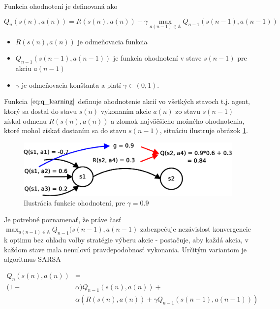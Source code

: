 Funkcia ohodnotení je definovaná ako

\begin{equation}
Q_{n}(s(n),a(n)) = R(s(n),a(n)) + \gamma \max_{a(n-1) \in \mathbb{A}} Q_{n-1}(s(n-1), a(n-1))
\label{eq:q_learning}
\end{equation}

\begin{itemize}
 \item $R(s(n),a(n))$ je odmeňovacia funkcia
 \item $Q_{n-1}(s(n-1),a(n-1))$ je funkcia ohodnotení v stave $s(n-1)$ pre akciu $a(n-1)$
 \item $\gamma$ je odmeňovacia konštanta a platí $\gamma \in (0, 1)$.
\end{itemize}

Funkcia $\ref{eq:q_learning}$ definuje ohodnotenie akcií vo všetkých stavoch t.j.
agent, ktorý sa dostal do stavu $s(n)$ vykonaním akcie $a(n)$ zo stavu
$s(n-1)$ získal odmenu $R(s(n),a(n))$ a zlomok najväčšieho možného ohodnotenia, ktoré
mohol získať dostaním sa do stavu $s(n-1)$, situáciu ilustruje obrázok \ref{img:q_learning}.

\begin{figure}[!htb]
\center
\includegraphics[scale=.6]{../diagrams/q_learning_detail.eps}
\caption{Ilustrácia funkcie ohodnotení, pre $\gamma = 0.9$}
\label{img:q_learning}
\end{figure}

Je potrebné poznamenať, že práve časť $\max_{a(n-1) \in \mathbb{A}} Q_{n-1}(s(n-1), a(n-1)$
zabezpečuje nezávislosť konvergencie k optimu bez ohľadu voľby stratégie výberu akcie -
postačuje, aby každá akcia, v každom stave mala nenulovú pravdepodobnosť vykonania.
Určitým variantom je algoritmus SARSA \cite{bib:sarsa}

\begin{align}
Q_{n}(s(n),a(n)) &= \nonumber \\
 (1-&\alpha)Q_{n-1}(s(n),a(n)) + \nonumber  \\
&\alpha(R(s(n),a(n)) + \gamma Q_{n-1}(s(n-1), a(n-1)))
\label{eq:sarsa}
\end{align}

